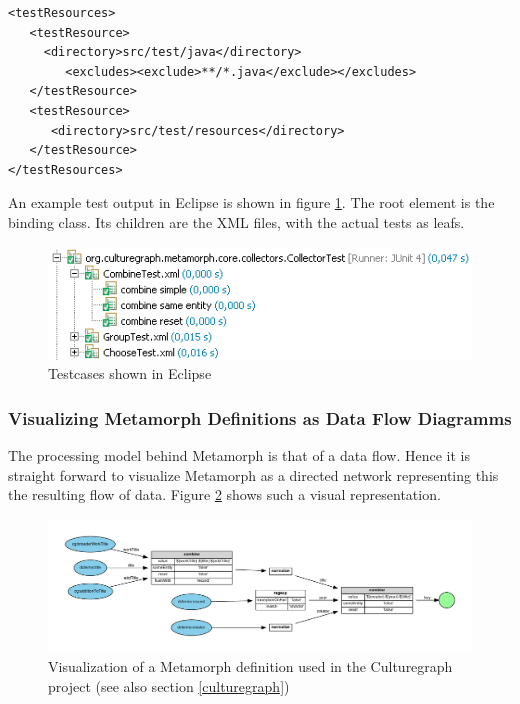 \documentclass[12pt,a4paper]{article}
\begin{document}
\begin{lstlisting}[float=htb, label=maven_test,caption=Telling Maven not to ignore resources colocated with java files in the test source directory.]
<testResources>
   <testResource>
     <directory>src/test/java</directory>
        <excludes><exclude>**/*.java</exclude></excludes>	
   </testResource>
   <testResource>
      <directory>src/test/resources</directory>
   </testResource>
</testResources> 
\end{lstlisting}

An example test output in Eclipse is shown in figure \ref{fig:junit}. The root element is the binding class. Its children are the XML files, with the actual tests as leafs.

\begin{figure}[htp]
\centering
\includegraphics[width=.75\textwidth]{figures/junit}
\caption{Testcases shown in Eclipse}\label{fig:junit}
\end{figure}

\subsubsection{Visualizing Metamorph Definitions as Data Flow Diagramms}

The processing model behind Metamorph is that of a data flow. Hence it is straight forward to visualize Metamorph as a directed network representing this the resulting flow of data. Figure \ref{fig:match-title} shows such a visual representation. 

\begin{figure}[htp]
\centering
\includegraphics[width=1\textwidth]{figures/match-title}
\caption{Visualization of a Metamorph definition used in the Culturegraph project (see also section \ref{culturegraph})}\label{fig:match-title}
\end{figure}
\end{document}
